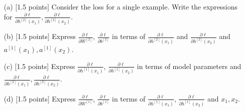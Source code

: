 \documentclass{article}
\newif\ifsolutions
\newenvironment{labelledanswer}{{\bf Answer:} \sf }{}%
\newcommand{\answer}[2]
{{
\ifsolutions
\begin{labelledanswer}
\color{red} 
#2
\end{labelledanswer}
\else
#1
\fi
}}
\begin{document}
\begin{itemize}
    \item [(a)] [1.5 points] Consider the loss for a single example. Write the expressions for $\frac{\partial \ell}{\partial h^{[2]}(x_1)},  \frac{\partial \ell}{\partial h^{[2]}(x_2)}$. 
    
    \answer{}{

$$
\frac{\partial}{\partial h^{[2]}(x_1)} \ell(x_1, x_2, y; W, b)= \frac{1}{1 + \exp(-y{h^{[2]}(x_1)}^\top h^{[2]}(x_2))} \;  \left(  0 + \exp(-y{h^{[2]}(x_1)}^\top h^{[2]}(x_2)) (-y h^{[2]}(x_2))   \right)
$$
$$
= \frac{ (-y h^{[2]}(x_2)) e^{(-y{h^{[2]}(x_1)}^\top h^{[2]}(x_2))}}{1 + e^{(-y{h^{[2]}(x_1)}^\top h^{[2]}(x_2))}}
$$

$$
\frac{\partial}{\partial h^{[2]}(x_2)} \ell(x_1, x_2, y; W, b)= \frac{1}{1 + \exp(-y{h^{[2]}(x_1)}^\top h^{[2]}(x_2))} \;  \left(  0 + \exp(-y{h^{[2]}(x_1)}^\top h^{[2]}(x_2)) (-y {h^{[2]}(x_1))}^\top   \right)
$$
$$
= \frac{ (-y {h^{[2]}(x_1)}^\top) e^{(-y{h^{[2]}(x_1)}^\top h^{[2]}(x_2))}}{1 + e^{(-y{h^{[2]}(x_1)}^\top h^{[2]}(x_2))}} 
$$           
    }
    
    \item [(b)] [1.5 points] Express $\frac{\partial \ell}{\partial W^{[2]}}$, $\frac{\partial \ell}{\partial b^{[2]}}$ in terms of $\frac{\partial \ell}{\partial h^{[2]}(x_1)}$ and $\frac{\partial \ell}{\partial h^{[2]}(x_2)}$ and $a^{[1]}(x_1), a^{[1]}(x_2)$.
    
    \answer{}{
$$
    \ell(x_1, x_2, y; W, b) = \log\left(1 + \exp(-y{h^{[2]}(x_1)}^\top h^{[2]}(x_2))\right) 
$$
$$
= \log\left(1 + \exp(-y{(W^{[2]}a^{[1]}(x_1) + b^{[2]})}^\top  (W^{[2]}a^{[1]}(x_2) + b^{[2]}))\right)
$$
$$
= \log\left(1 + e^{{(-yW^{[2]}a^{[1]}(x_1)}^\top - {yb^{[2]}}^\top )  (W^{[2]}a^{[1]}(x_2) + b^{[2]})}\right)
$$
$$
= \log\left(1 + e^{{(-yW^{[2]}a^{[1]}(x_1)}^\top - {yb^{[2]}}^\top )  (W^{[2]}a^{[1]}(x_2) + b^{[2]})}\right)
$$   
    
    }
    
    \item [(c)] [1.5 points] Express $\frac{\partial \ell}{\partial h^{[1]}(x_1)}$, $\frac{\partial \ell}{\partial h^{[1]}(x_2)}$ in terms of model parameters and $\frac{\partial \ell}{\partial h^{[2]}(x_1)}, \frac{\partial \ell}{\partial h^{[2]}(x_2)}$.
    
    \answer{}{}
    
    \item [(d)] [1.5 points] Express $\frac{\partial \ell}{\partial W^{[1]}}$, $\frac{\partial \ell}{\partial b^{[1]}}$ in terms of $\frac{\partial \ell}{\partial h^{[1]}(x_1)}$, $\frac{\partial \ell}{\partial h^{[1]}(x_2)}$ and $x_1, x_2$.
    
    \answer{}{}
    
\end{itemize}
\end{document}
